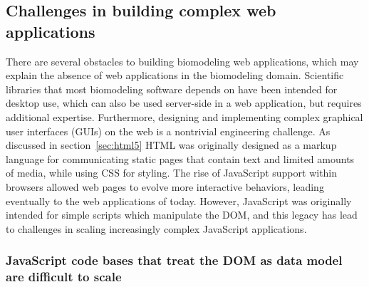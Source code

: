 \subsection{Challenges in building complex web applications}
There are several obstacles to building biomodeling web applications, which may explain the absence of web applications in the biomodeling domain.
Scientific libraries that most biomodeling software depends on have been intended for desktop use, which can also be used server-side in a web application, but requires additional expertise.
Furthermore, designing and implementing complex graphical user interfaces (GUIs) on the web is a nontrivial engineering challenge.
As discussed in section~\ref{sec:html5} HTML was originally designed as a markup language for communicating static pages that contain text and limited amounts of media, while using CSS for styling.
The rise of JavaScript support within browsers allowed web pages to evolve more interactive behaviors, leading eventually to the web applications of today.
However, JavaScript was originally intended for simple scripts which manipulate the DOM, and this legacy has lead to challenges in scaling increasingly complex JavaScript applications.

\subsubsection{JavaScript code bases that treat the DOM as data model are difficult to scale}

